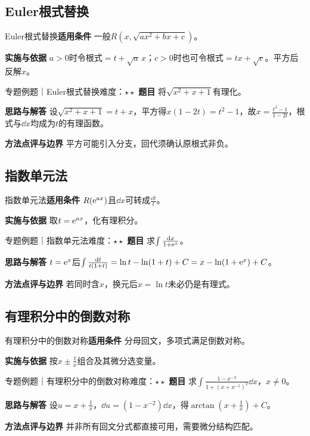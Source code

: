 \subsection{Euler根式替换}\label{mat:integrals_methods:i22}
\begin{method}{Euler根式替换}\textbf{适用条件} 一般$R(x,\sqrt{ax^2+bx+c})$。\par\textbf{实施与依据} $a>0$时令根式$=t+\sqrt a\,x$；$c>0$时也可令根式$=tx+\sqrt c$。平方后反解$x$。\end{method}
\begin{example}{专题例题｜Euler根式替换}{难度：$\star\star$}
\textbf{题目} 将$\sqrt{x^2+x+1}$有理化。\par\textbf{思路与解答} 设$\sqrt{x^2+x+1}=t+x$，平方得$x(1-2t)=t^2-1$，故$x=\frac{t^2-1}{1-2t}$，根式与$\dd x$均成为$t$的有理函数。\par\textbf{方法点评与边界} 平方可能引入分支，回代须确认原根式非负。
\end{example}
\subsection{指数单元法}\label{mat:integrals_methods:i23}
\begin{method}{指数单元法}\textbf{适用条件} $R(\mathrm{e}^{ax})$且$\dd x$可转成$\frac{\dd t}{t}$。\par\textbf{实施与依据} 取$t=\mathrm{e}^{ax}$，化有理积分。\end{method}
\begin{example}{专题例题｜指数单元法}{难度：$\star\star$}
\textbf{题目} 求$\int\frac{\mathop{}\!\mathrm{d} x}{1+\mathrm{e}^x}$。\par\textbf{思路与解答} $t=\mathrm{e}^x$后$\int\frac{\mathop{}\!\mathrm{d} t}{t(1+t)}=\ln t-\ln(1+t)+C=x-\ln(1+\mathrm{e}^x)+C$。\par\textbf{方法点评与边界} 若同时含$x$，换元后$x=\ln t$未必仍是有理式。
\end{example}
\subsection{有理积分中的倒数对称}\label{mat:integrals_methods:i24}
\begin{method}{有理积分中的倒数对称}\textbf{适用条件} 分母回文，多项式满足倒数对称。\par\textbf{实施与依据} 按$x\pm\frac{1}{x}$组合及其微分选变量。\end{method}
\begin{example}{专题例题｜有理积分中的倒数对称}{难度：$\star\star$}
\textbf{题目} 求$\int\frac{1-x^{-2}}{1+(x+x^{-1})^2}\dd x$，$x\ne0$。\par\textbf{思路与解答} 设$u=x+\frac{1}{x}$，$\dd u=(1-x^{-2})\dd x$，得$\arctan(x+\frac{1}{x})+C$。\par\textbf{方法点评与边界} 并非所有回文分式都直接可用，需要微分结构匹配。
\end{example}
